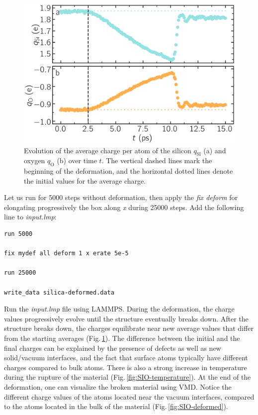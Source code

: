 \documentclass[9pt,tutorial]{livecoms}
\begin{document}
\begin{figure}
\includegraphics[width=\linewidth]{SIO-deformed-charge}
\caption{Evolution of the average charge per atom of the silicon $q_\text{Si}$
(a) and oxygen $q_\text{O}$ (b) over time $t$. The vertical dashed lines mark
the beginning of the deformation, and the horizontal dotted lines denote the
initial values for the average charge.}
\label{fig:SIO-deformed-charge}
\end{figure}

Let us run for 5000 steps without deformation, then apply the \textit{fix deform}
for elongating progressively the box along \textit{x} during 25000 steps. Add
the following line to \textit{input.lmp}:
\begin{lstlisting}
run 5000

fix mydef all deform 1 x erate 5e-5

run 25000

write_data silica-deformed.data
\end{lstlisting}
Run the \textit{input.lmp} file using LAMMPS. During the deformation, the charge
values progressively evolve until the structure eventually breaks down. After the
structure breaks down, the charges equilibrate near new average values that differ
from the starting averages (Fig.\,\ref{fig:SIO-deformed-charge}). The difference
between the initial and the final charges can be explained by the presence of
defects as well as new solid/vacuum interfaces, and the fact that surface atoms
typically have different charges compared to bulk atoms. There is also a strong
increase in temperature during the rupture of the material (Fig.\,\ref{fig:SIO-temperature}).
At the end of the deformation, one can visualize the broken material using VMD.
Notice the different charge values of the atoms located near the vacuum interfaces,
compared to the atoms located in the bulk of the material (Fig.\,\ref{fig:SIO-deformed}).
\end{document}
